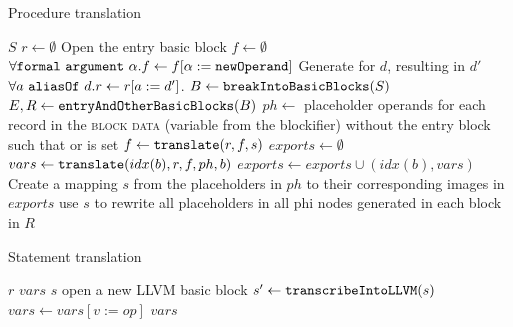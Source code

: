 \begin{algorithm}[t]
    \caption{Procedure translation}
    \label{trans_proc}
    \begin{algorithmic}[1]
        \Require $S$ 
        \State $r \gets \emptyset$ 
        \State Open the entry basic block
        \State $f \gets \emptyset$ 
        \State $\forall \mathtt{formal\ argument}\ \alpha . f \gets f [ \alpha := \mathtt{newOperand}]$
            \State Generate  for $d$, resulting in $d'$
            \State $\forall  a\ \mathtt{aliasOf}\ d .  r \gets r[a := d']$. 
        \EndFor
        \State $B \gets \mathtt{breakIntoBasicBlocks} (S)$ 
        \State $E,R \gets \mathtt{entryAndOtherBasicBlocks}(B)$
        \State $ph \gets$ placeholder operands for each record in the \textsc{block data} (variable from the blockifier) without the entry block such that  or  is set
            \State $f \gets \mathtt{translate}(r, f, s)$ 
        \EndFor
        \State $exports \gets \emptyset$ 
            \State $vars \gets \mathtt{translate}(idx(b), r, f, ph, b)$ 
            \State $exports \gets exports \cup (idx(b),vars)$
        \EndFor
        \State Create a mapping $s$ from the placeholders in $ph$ to their corresponding images in $exports$
        \State use $s$ to rewrite all placeholders in all phi nodes generated in each block in $R$
    \end{algorithmic}
\end{algorithm}

\begin{algorithm}
    \caption{Statement translation}
    \label{transl_stmt}
    \begin{algorithmic}[1]
        \Require $r$ 
        \Require $vars$ 
        \Require $s$ 
            \State open a new LLVM basic block
        \Else
            \State $s' \gets \mathtt{transcribeIntoLLVM}(s)$
            \State {}
                \State $vars \gets vars [v := op]$ 
            \EndFor
        \EndIf
        \State \Return $vars$
    \end{algorithmic}
\end{algorithm}

